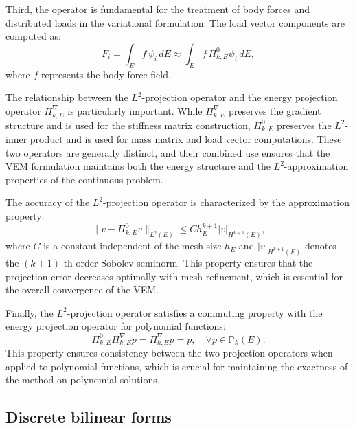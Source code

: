 \documentclass{article}
\begin{document}
Third, the operator is fundamental for the treatment of body forces and distributed loads in the variational formulation. The load vector components are computed as:
\begin{equation}\label{eq:load_vector}
    F_i = \int_E f \, \psi_i \, dE \approx \int_E f \, \Pi^0_{k,E} \psi_i \, dE,
\end{equation}
where $f$ represents the body force field.

The relationship between the $L^2$-projection operator and the energy projection operator $\Pi^{\nabla}_{k,E}$ is particularly important. While $\Pi^{\nabla}_{k,E}$ preserves the gradient structure and is used for the stiffness matrix construction, $\Pi^0_{k,E}$ preserves the $L^2$-inner product and is used for mass matrix and load vector computations. These two operators are generally distinct, and their combined use ensures that the VEM formulation maintains both the energy structure and the $L^2$-approximation properties of the continuous problem.

The accuracy of the $L^2$-projection operator is characterized by the approximation property:
\begin{equation}\label{eq:l2_approximation_property}
    \| v - \Pi^0_{k,E} v \|_{L^2(E)} \leq C h_E^{k+1} |v|_{H^{k+1}(E)},
\end{equation}
where $C$ is a constant independent of the mesh size $h_E$ and $|v|_{H^{k+1}(E)}$ denotes the $(k+1)$-th order Sobolev seminorm. This property ensures that the projection error decreases optimally with mesh refinement, which is essential for the overall convergence of the VEM.

Finally, the $L^2$-projection operator satisfies a commuting property with the energy projection operator for polynomial functions:
\begin{equation}\label{eq:commuting_property}
    \Pi^0_{k,E} \Pi^{\nabla}_{k,E} p = \Pi^{\nabla}_{k,E} p = p, \quad \forall p \in \mathbb{P}_k(E).
\end{equation}
This property ensures consistency between the two projection operators when applied to polynomial functions, which is crucial for maintaining the exactness of the method on polynomial solutions.


\subsection{Discrete bilinear forms}
\label{sec:discrete_bilinear}
\end{document}
